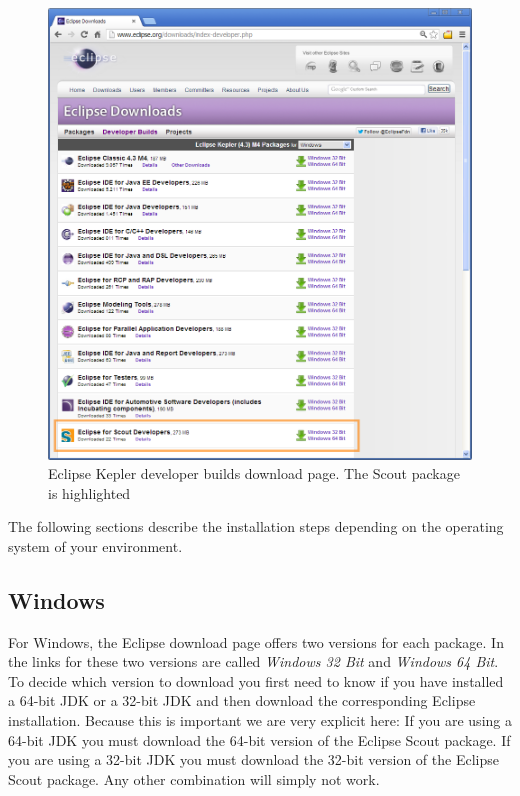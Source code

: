 \documentclass[a4paper,10pt,twoside]{book}
\begin{document}
\begin{figure}
\includegraphics[width=15cm]{scout_download.png}
\caption{Eclipse Kepler developer builds download page. The Scout package is highlighted}
\end{figure}

The following sections describe the installation steps depending on the operating system of your environment.

\subsection{Windows}

For Windows, the Eclipse download page offers two versions for each package.
In  the links for these two versions are called \textit{Windows 32 Bit} and \textit{Windows 64 Bit}.
To decide which version to download you first need to know if you have installed a 64-bit JDK or a 32-bit JDK and then download the corresponding Eclipse installation.
Because this is important we are very explicit here: If you are using a 64-bit JDK you must download the 64-bit version of the Eclipse Scout package.
If you are using a 32-bit JDK you must download the 32-bit version of the Eclipse Scout package.
Any other combination will simply not work.
\end{document}
